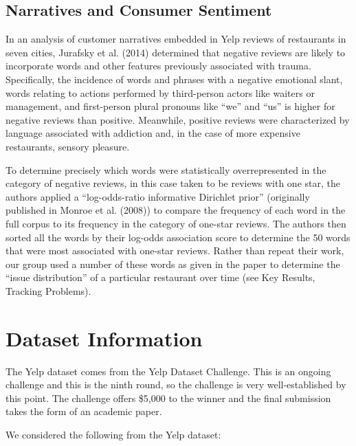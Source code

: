 \subsection{Narratives and Consumer Sentiment}

\quad In an analysis of customer narratives embedded in Yelp reviews of restaurants in seven cities, Jurafsky et al. (2014) determined that negative reviews are likely to incorporate words and other features previously associated with trauma. Specifically, the incidence of words and phrases with a negative emotional slant, words relating to actions performed by third-person actors like waiters or management, and first-person plural pronouns like “we” and “us” is higher for negative reviews than positive. Meanwhile, positive reviews were characterized by language associated with addiction and, in the case of more expensive restaurants, sensory pleasure.

\quad To determine precisely which words were statistically overrepresented in the category of negative reviews, in this case taken to be reviews with one star, the authors applied a “log-odds-ratio informative Dirichlet prior” (originally published in Monroe et al. (2008)) to compare the frequency of each word in the full corpus to its frequency in the category of one-star reviews. The authors then sorted all the words by their log-odds association score to determine the 50 words that were most associated with one-star reviews. Rather than repeat their work, our group used a number of these words as given in the paper to determine the “issue distribution” of a particular restaurant over time (see Key Results, Tracking Problems).

\section{Dataset Information}

\quad The Yelp dataset comes from the Yelp Dataset Challenge. This is an ongoing challenge and this is the ninth round, so the challenge is very well-established by this point. The challenge offers \$5,000 to the winner and the final submission takes the form of an academic paper.

\quad We considered the following from the Yelp dataset:

